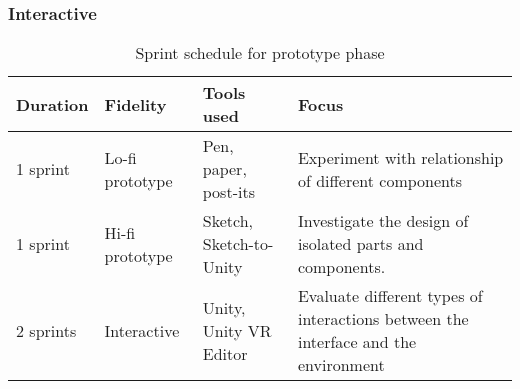 \subsubsection{Interactive}
\label{method:prototype:interactive}


\begin{table}[]
  \centering
  \caption{Sprint schedule for prototype phase}
  \label{table:sprints}
  \begin{tabular}{|l|l|l| p{5cm}|}
     \hline
    \textbf{Duration} & \textbf{Fidelity} & \textbf{Tools used} & \textbf{Focus} \\\hline
    1 sprint                         & Lo-fi prototype  & Pen, paper, post-its    & Experiment with relationship of different components                               \\\hline
    1 sprint                        & Hi-fi prototype & Sketch, Sketch-to-Unity & Investigate the design of isolated parts and components.                           \\\hline
    2 sprints                 & Interactive   & Unity, Unity VR Editor  & Evaluate different types of interactions between the interface and the environment  \\\hline
  \end{tabular}
\end{table}
